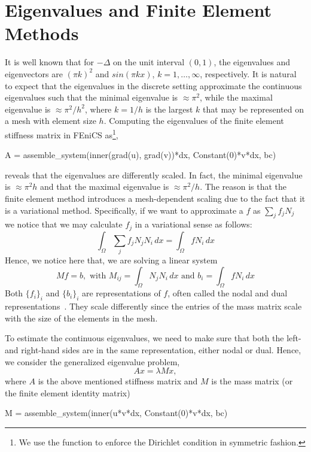 \section{Eigenvalues and Finite Element Methods}
\label{sec:eig and fem}

It is well known that for $-\Delta$ on the unit interval
$(0,1)$, the eigenvalues 
and eigenvectors
are $(\pi k)^2$ and $sin(\pi k x)$, $k=1, \ldots, \infty$, respectively. 
It is natural to expect that the eigenvalues in the discrete setting
approximate the continuous eigenvalues such that 
the minimal eigenvalue is $\approx \pi^2$, while the maximal eigenvalue
is $\approx \pi^2 /h^2$, where $k=1/h$ is the largest $k$ that may be represented
on a mesh with element size $h$.  
Computing the eigenvalues of the finite element stiffness matrix in FEniCS as\footnote{
We use the  function to enforce the Dirichlet
condition in symmetric fashion.}, 
\begin{python}
A = assemble_system(inner(grad(u), grad(v))*dx, Constant(0)*v*dx, bc)
\end{python}
reveals that the eigenvalues are differently scaled. In fact, the minimal 
eigenvalue is $\approx \pi^2 h$ and that the maximal eigenvalue is  $\approx \pi^2/h$.      
The reason is that the finite element method introduces a mesh-dependent 
scaling due to the fact that it is a variational method. 
Specifically, if we want to approximate a $f$ as $\sum_j f_j N_j$ we notice
that we may calculate $f_j$ in a variational sense as follows: 
\[
\int_\Omega \sum_j f_j N_j N_i \, dx = \int_\Omega f N_i \, dx   
\]
Hence, we notice here that, we are solving a linear system
\[
	M f = b, \mbox{ with } M_{ij} = \int_\Omega N_j N_i \, dx \mbox{ and } b_i = \int_\Omega f N_i \, dx  
\]
Both $\{f_i\}_i$ and $\{b_i\}_i$ are representations of $f$, often called the nodal and dual representations~\cite{mardal2011preconditioning}. They scale differently since
the entries of the mass matrix scale with the size of the elements in the mesh. 

To estimate the continuous eigenvalues, we  need to make sure that both the left- and right-hand sides are in the same representation, either nodal
or dual. Hence, we consider the generalized eigenvalue problem, 
\begin{equation} 
\label{geneig}
A x = \lambda M x,   
\end{equation} 
where $A$ is the above mentioned stiffness matrix and $M$ is the mass
matrix (or the finite element identity matrix) 
\begin{python}
M = assemble_system(inner(u*v*dx, Constant(0)*v*dx, bc)
\end{python}

